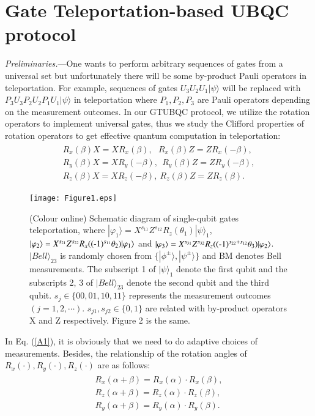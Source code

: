 \documentclass[aps,pra,showpacs,twocolumn,superscriptaddress]{revtex4-1}
\begin{document}
\section{Gate Teleportation-based UBQC protocol}
\label{sec:jud}
\emph{Preliminaries.}---One wants to perform arbitrary sequences of gates from a universal set but unfortunately there will be some by-product Pauli operators in teleportation. For example, sequences of gates $U_3U_2U_1|\psi\rangle$ will be replaced with $P_3U_3P_2U_2P_1U_1|\psi\rangle$ in teleportation where $P_1, P_2, P_3$ are Pauli operators depending on the measurement outcomes. In our GTUBQC protocol, we utilize the rotation operators to implement universal gates, thus we study the Clifford properties of rotation operators \cite{Jozsa05} to get effective quantum computation in teleportation:
\begin{eqnarray}\label{A1}
\begin{array}{l}
\displaystyle R_x(\beta)X=XR_x(\beta), \ \ \ R_x(\beta)Z=ZR_x(-\beta),\\
\displaystyle R_y(\beta)X=XR_y(-\beta),\ \ R_y(\beta)Z=ZR_y(-\beta),\\
\displaystyle R_z(\beta)X=XR_z(-\beta), \ R_z(\beta)Z=ZR_z(\beta).
\end{array}
\end{eqnarray}

\begin{figure*}[!htp]
  \centering
  \texttt{[image: Figure1.eps]}
  \caption{(Colour online) Schematic diagram of single-qubit gates teleportation, where $|\varphi_1\rangle=X^{s_{11}}Z^{s_{12}}R_z(\theta_1)|\psi\rangle_1$, $|\varphi_2\rangle=X^{s_{21}}Z^{s_{22}}R_x((\textnormal{-}1)^{s_{11}}\theta_2)|\varphi_1\rangle$ and $|\varphi_3\rangle=X^{s_{31}}Z^{s_{32}} R_z((\textnormal{-}1)^{s_{22}+s_{12}}\theta_3)|\varphi_2\rangle$. $|Bell\rangle_{23}$ is randomly chosen from $\{|\phi^{\pm}\rangle, |\psi^{\pm}\rangle\}$ and BM denotes Bell measurements. The subscript 1 of $|\psi\rangle_1$ denote the first qubit and the subscripts 2, 3 of $|Bell\rangle_{23}$ denote the second qubit and the third qubit. $s_j\in\{00, 01, 10, 11\}$ represents the measurement outcomes $(j=1, 2, \cdots)$. $s_{j1}, s_{j2}\in \{0,1\}$ are related with by-product operators X and Z respectively. Figure 2 is the same.}\label{F1}
\end{figure*}

In Eq. (\ref{A1}), it is obviously that we need to do adaptive choices of measurements. Besides, the relationship of the rotation angles of $R_x(\cdot), R_y(\cdot), R_z(\cdot)$ are as follows:
\begin{eqnarray}
\begin{array}{l}
\displaystyle R_x(\alpha+\beta)=R_x(\alpha)\cdot R_x(\beta), \\
\displaystyle R_z(\alpha+\beta)=R_z(\alpha)\cdot R_z(\beta), \\
\displaystyle R_y(\alpha+\beta)=R_y(\alpha)\cdot R_y(\beta).
\end{array}
\end{eqnarray}
\end{document}
